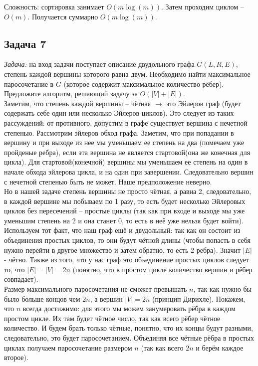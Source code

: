 \documentclass[a4paper,12pt]{article} %
\begin{document}
Сложность: сортировка занимает $ O(m\log(m)) $. Затем проходим циклом -- $ O(m) $. Получается суммарно $ O(m\log(m)) $. 

\subsection*{Задача 7}
\textit{Задача:} на вход задачи поступает описание двудольного графа $G(L,R,E)$, степень каждой вершины которого равна двум. Необходимо найти максимальное паросочетание в $G$ (которое содержит максимальное количество рёбер). Предложите алгоритм, решающий задачу за $O(|V| +|E|)$.\\

Заметим, что степень каждой вершины -- чётная $ \longrightarrow $ это Эйлеров граф (будет содержать себе один или несколько Эйлеров циклов). Это следует из таких рассуждений: от противного, допустим в графе существует вершина с нечетной степенью. Рассмотрим эйлеров обход графа. Заметим, что при попадании в вершину и при выходе из нее мы уменьшаем ее степень на два (помечаем уже пройденые ребра), если эта вершина не является стартовой(она же конечная для цикла). Для стартовой(конечной) вершины мы уменьшаем ее степень на один в начале обхода эйлерова цикла, и на один при завершении. Следовательно вершин с нечетной степенью быть не может. Наше предположение неверно. \\

Но в нашей задаче степень вершины не просто чётная, а равна 2, следовательно, в каждой вершине мы побываем по 1 разу, то есть будет несколько Эйлеровых циклов без пересечений -- простые циклы (так как при входе и выходе мы уже уменьшим степень на 2 и она станет 0, то есть в неё уже нельзя будет войти).\\

Используем тот факт, что наш граф ещё и двудольный: так как он состоит из объединения простых циклов, то они будут чётной длины (чтобы попасть в себя нужно перейти в другое множество и затем обратно, то есть 2 ребра). Значит $ |E| $ - чётно. Также из того, что у нас граф это объединение простых циклов следует то, что $ |E| = |V| = 2n$ (понятно, что в простом цикле количество вершин и рёбер совпадает).\\

Размер максимального паросочетания не сможет превышать $ n $, так как нужно бы было больше концов чем  $ 2n $, а вершин $|V| = 2n$ (принцип Дирихле). Покажем, что $ n $ всегда достижимо: для этого мы можем занумеровать рёбра в каждом простом цикле. Их там будет чётное число, так как всего рёбер чётное количество. И будем брать только чётные, понятно, что их концы будут разными, следовательно, это будет паросочетанием. Объединяя все чётные рёбра в простых циклах получаем паросочетание размером $ n $ (так как всего $ 2n $ и берём каждое второе).\\
\end{document}
